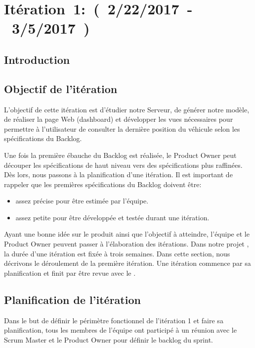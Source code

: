 \section{Itération~1:~(~2/22/2017~-~3/5/2017~)}
\subsection{Introduction}
\subsection{Objectif de l'itération}

L'objectif de cette itération est d'étudier notre Serveur, de générer notre
modèle, de réaliser la page Web (dashboard) et développer les vues nécessaires
pour permettre à l'utilisateur de consulter la dernière position du véhicule
selon les spécifications du Backlog.

Une fois la première ébauche du Backlog est réalisée, le Product Owner peut
découper les spécifications de haut niveau vers des spécifications plus
raffinées. Dès lors, nous passons à la planification d'une itération. Il est
important de rappeler que les premières spécifications du Backlog doivent être:

\begin{itemize}
    \item assez précise pour être estimée par l'équipe.
    \item assez petite pour être développée et testée durant une itération.
\end{itemize}

Ayant une bonne idée sur le produit ainsi que l'objectif à atteindre, l'équipe
et le Product Owner peuvent passer à l'élaboration des itérations. Dans notre
projet , la durée d'une itération est fixée à
trois semaines. Dans cette section, nous décrivons le déroulement de la
première itération. Une itération commence par sa planification et finit par
être revue avec le .

\subsection{Planification de l'itération}

Dans le but de définir le périmètre fonctionnel de l'itération 1 et faire sa
planification, tous les membres de l'équipe ont participé à un réunion avec le
Scrum Master et le Product Owner pour définir le backlog du sprint.

